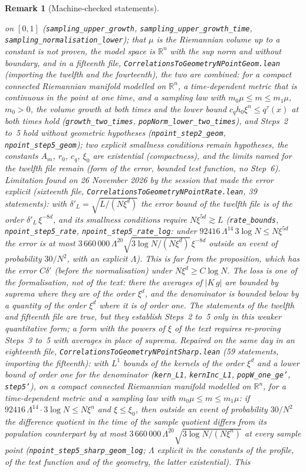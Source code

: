 \documentclass[11pt,a4paper]{article}
\theoremstyle{stmt}
\theoremstyle{defn}
\theoremstyle{rmk}
\newtheorem{remark}[theorem]{Remark}
\numberwithin{equation}{section}
\newcommand{\R}{\mathbb{R}}
\begin{document}
{\begin{remark}[Machine-checked statements]
\begin{itemize}
on $[0,1]$ (\texttt{sampling\_upper\_growth}, \texttt{sampling\_upper\_growth\_time}, \texttt{sampling\_normalisation\_lower}); that $\mu$ is the Riemannian volume up to a constant is not proven, the model space is $\R^n$ with the sup norm and without boundary, and in a fifteenth file, \texttt{CorrelationsToGeometryNPointGeom.lean} (importing the twelfth and the fourteenth), the two are combined: for a compact connected Riemannian manifold modelled on $\R^n$, a time-dependent metric that is continuous in the point at one time, and a sampling law with $m_0\mu\le m\le m_1\mu$, $m_0>0$, the volume growth at both times and the lower bound $c_q h_0\xi^n\le q^\tau(x)$ at both times hold (\texttt{growth\_two\_times}, \texttt{popNorm\_lower\_two\_times}), and Steps~2 to~5 hold without geometric hypotheses (\texttt{npoint\_step2\_geom}, \texttt{npoint\_step5\_geom}); two explicit smallness conditions remain hypotheses, the constants $A_m$, $r_0$, $c_q$, $\xi_0$ are existential (compactness), and the limits named for the twelfth file remain (form of the error, bounded test function, no Step~6). \emph{Limitation found on 26 November 2026 by the session that made the error explicit} (sixteenth file, \texttt{CorrelationsToGeometryNPointRate.lean}, 39 statements): with $\delta'_L=\sqrt{L/(N\xi^d)}$ the error bound of the twelfth file is of the order $\delta'_L\,\xi^{-8d}$, and its smallness conditions require $N\xi^{5d}\gtrsim L$ (\texttt{rate\_bounds}, \texttt{npoint\_step5\_rate}, \texttt{npoint\_step5\_rate\_log}: under $92416\,\Lambda^{14}\,3\log N\le N\xi^{5d}$ the error is at most $3\,660\,000\,\Lambda^{20}\sqrt{3\log N/(N\xi^d)}\,\xi^{-8d}$ outside an event of probability $30/N^2$, with an explicit $\Lambda$). This is far from the proposition, which has the error $C\delta'$ (before the normalisation) under $N\xi^d\ge C\log N$. The loss is one of the formalisation, not of the text: there the averages of $|K\,g|$ are bounded by suprema where they are of the order $\xi^d$, and the denominator is bounded below by a quantity of the order $\xi^d$ where it is of order one. The statements of the twelfth and fifteenth file are true, but they establish Steps~2 to~5 only in this weaker quantitative form; a form with the powers of $\xi$ of the text requires re-proving Steps~3 to~5 with averages in place of suprema. \emph{Repaired on the same day} in an eighteenth file, \texttt{CorrelationsToGeometryNPointSharp.lean} (59 statements, importing the fifteenth): with $L^1$ bounds of the kernels of the order $\xi^d$ and a lower bound of order one for the denominator (\texttt{kern\_L1}, \texttt{kernInc\_L1}, \texttt{popW\_one\_ge'}, \texttt{step5'}), on a compact connected Riemannian manifold modelled on $\R^n$, for a time-dependent metric and a sampling law with $m_0\mu\le m\le m_1\mu$: if $92416\,\Lambda^{14}\cdot3\log N\le N\xi^n$ and $\xi\le\xi_0$, then outside an event of probability $30/N^2$ the difference quotient in the time of the sample quotient differs from its population counterpart by at most $3\,660\,000\,\Lambda^{20}\sqrt{3\log N/(N\xi^n)}$ at every sample point (\texttt{npoint\_step5\_sharp\_geom\_log}; $\Lambda$ explicit in the constants of the profile, of the test function and of the geometry, the latter existential). This 
\end{itemize}
\end{remark}}
\end{document}
